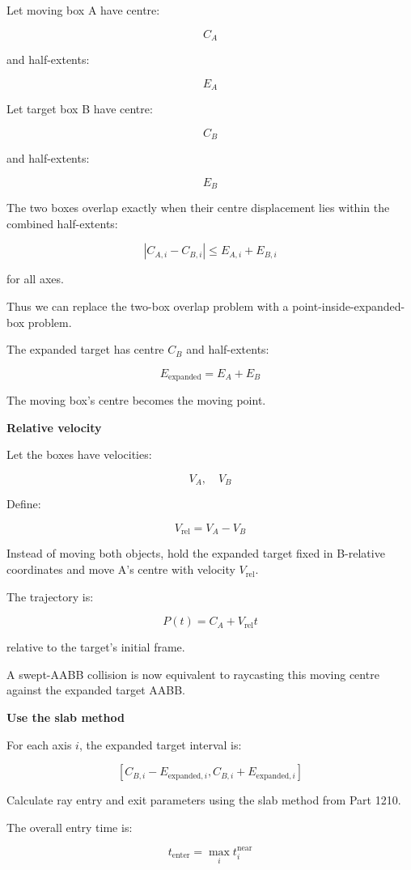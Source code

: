 Let moving box A have centre:

\[
C_A
\]

and half-extents:

\[
E_A
\]

Let target box B have centre:

\[
C_B
\]

and half-extents:

\[
E_B
\]

The two boxes overlap exactly when their centre displacement lies within the combined half-extents:

\[
\boxed{ |C_{A,i}-C_{B,i}|\le E_{A,i}+E_{B,i} }
\]

for all axes.

Thus we can replace the two-box overlap problem with a point-inside-expanded-box problem.

The expanded target has centre \(C_B\) and half-extents:

\[
\boxed{ E_{\mathrm{expanded}}=E_A+E_B }
\]

The moving box's centre becomes the moving point.

\textbf{Relative velocity}

Let the boxes have velocities:

\[
V_A,\quad V_B
\]

Define:

\[
\boxed{ V_{\mathrm{rel}}=V_A-V_B }
\]

Instead of moving both objects, hold the expanded target fixed in B-relative coordinates and move A's centre with velocity \(V_{\mathrm{rel}}\).

The trajectory is:

\[
\boxed{ P(t)=C_A+V_{\mathrm{rel}}t }
\]

relative to the target's initial frame.

A swept-AABB collision is now equivalent to raycasting this moving centre against the expanded target AABB.

\textbf{Use the slab method}

For each axis \(i\), the expanded target interval is:

\[
[C_{B,i}-E_{\mathrm{expanded},i}, C_{B,i}+E_{\mathrm{expanded},i}]
\]

Calculate ray entry and exit parameters using the slab method from Part 1210.

The overall entry time is:

\[
\boxed{ t_{\mathrm{enter}}=\max_i t_i^{\mathrm{near}} }
\]

